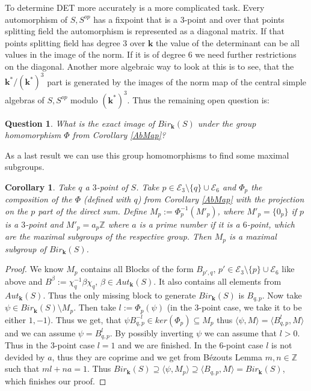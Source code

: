 \documentclass[12pt, oneside, reqno]{amsart}
\newtheorem{corollary}[theorem]{Corollary}
\newtheorem*{question}{Question}
\begin{document}
\noindent
 To determine DET more accurately is a more complicated task. Every automorphism of $S,S^{op}$ has a fixpoint that is a $3$-point and over that points splitting field the automorphism is represented as a diagonal matrix. If that points splitting field has degree $3$ over $\textbf{k}$ the value of the determinant can be all values in the image of the norm. If it is of degree $6$ we need further restrictions on the diagonal. Another more algebraic way to look at this is to see, that the $\textbf{k}^*/(\textbf{k}^*)^3$ part is generated by the images of the norm map of the central simple algebras of $S,S^{op}$ modulo $(\textbf{k}^*)^3$. Thus the remaining open question is:
\begin{question}
    What is the exact image of $Bir_{\textbf{k}}(S)$ under the group homomorphism $\Phi$ from Corollary \ref{AbMap}? 
\end{question}
\noindent As a last result we can use this group homomorphisms to find some maximal subgroups.
\begin{corollary}
    Take $q$ a $3$-point of $S$. Take $p \in \mathcal{E}_3 \setminus \{ q \} \cup \mathcal{E}_6$ and $\Phi_{p}$ the composition of the $\Phi$ (defined with $q$) from Corollary \ref{AbMap} with the projection on the $p$ part of the direct sum. Define $M_{p} := \Phi_p^{-1}(M'_p)$, where $M'_p = \{ 0_p \} $ if $p$ is a $3$-point and $M'_p = a_p\mathbb{Z}$ where $a$ is a prime number if it is a $6$-point, which are the maximal subgroups of the respective group. Then $M_p$ is a maximal subgroup of $Bir_{\textbf{k}}(S)$.
\end{corollary}
\begin{proof}
    We know $M_p$ contains all Blocks of the form $B_{p',q}, \, p' \in \mathcal{E}_3 \setminus \{ p\} \cup \mathcal{E}_6 $ like above and $B^{\beta} := \chi_q^{-1} \beta \chi_q, \, \beta \in Aut_{\textbf{k}}(S)$. It also contains all elements from $Aut_{\textbf{k}}(S)$. Thus the only missing block to generate $Bir_{\textbf{k}}(S)$ is $B_{q,p}$. Now take $\psi \in Bir_{\textbf{k}}(S) \setminus M_p$. Then take $l:= \Phi_p(\psi)$ (in the $3$-point case, we take it to be either $1,-1$). Thus we get, that $\psi B_{q,p}^{-l} \in ker(\Phi_p) \subseteq M_p$ thus $\langle \psi , M \rangle = \langle B_{q,p}^l,M \rangle$ and we can assume $\psi = B_{q,p}^l$. By possibly inverting $\psi$ we can assume that $l > 0$. Thus in the $3$-point case $l=1$ and we are finished. In the $6$-point case $l$ is not devided by $a$, thus they are coprime and we get from Bézouts Lemma $m,n \in \mathbb{Z}$ such that $ml + na = 1$. Thus $Bir_{\textbf{k}}(S) \supseteq \langle \psi,M_p \rangle \supseteq \langle B_{q,p},M \rangle = Bir_{\textbf{k}}(S)$, which finishes our proof.
\end{proof}

\end{document}
